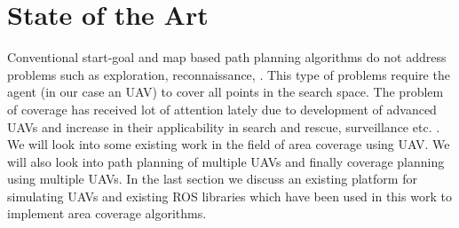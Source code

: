 \section{State of the Art}
\label{sec:sta}
Conventional start-goal and map based path planning algorithms do not address problems such as exploration, reconnaissance, \cite{1}. This type of problems require the agent (in our case an UAV) to cover all points in the search space. The problem of coverage has received lot of attention lately due to development of advanced UAVs and increase in their applicability in search and rescue, surveillance etc. \cite{2,3,4,6,8}. We will look into some existing work in the field of area coverage using UAV. We will also look into path planning of multiple UAVs and finally coverage planning using multiple UAVs. In the last section we discuss an existing platform for simulating UAVs and existing ROS libraries which have been used in this work to implement area coverage algorithms.
